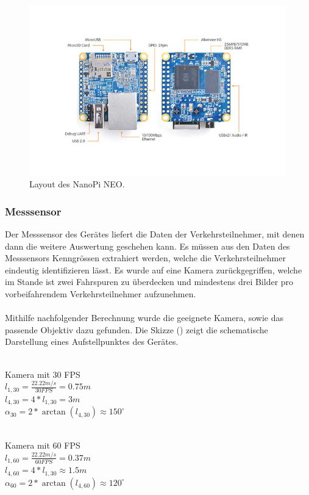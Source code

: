\begin{figure}[H]
  \centering
  \includegraphics[width=0.99\textwidth]{Hardware/NanoPi_Neo.jpg} 
  \caption{Layout des NanoPi NEO. \cite{NanoPiNeo}}
  \label{bLayout}
\end{figure}

\subsubsection{Messsensor}
Der Messsensor des Gerätes liefert die Daten der Verkehrsteilnehmer, mit denen dann die weitere Auswertung geschehen kann. Es müssen aus den Daten des Messsensors Kenngrössen extrahiert werden, welche die Verkehrsteilnehmer eindeutig identifizieren lässt. Es wurde auf eine Kamera zurückgegriffen, welche im Stande ist zwei Fahrspuren zu überdecken und mindestens drei Bilder pro vorbeifahrendem Verkehrsteilnehmer aufzunehmen. \\\\
Mithilfe nachfolgender Berechnung wurde die geeignete Kamera, sowie das passende Objektiv dazu gefunden. Die Skizze () zeigt die schematische Darstellung eines Aufstellpunktes des Gerätes.\\\\
\begin{citemize}

\item Kamera mit 30 FPS \\
$l_{ 1,30 } = \frac{ 22.22 m/s }{ 30 FPS} = 0.75 m$ \\ 
$l_{ 4,30 } = 4 * l_{1,30} = 3 m$\\
$\alpha_{30} = 2* \arctan(l_{4,30 }) \approx 150^\circ$ \\\\


\item Kamera mit 60 FPS \\
$l_{ 1,60 } = \frac{ 22.22 m/s }{ 60 FPS} = 0.37 m$ \\ 
$l_{ 4,60 } = 4 * l_{1,30} \approx 1.5 m$\\
$\alpha_{60} = 2* \arctan(l_{4,60 }) \approx 120^\circ$ \\\\
\end{citemize}

